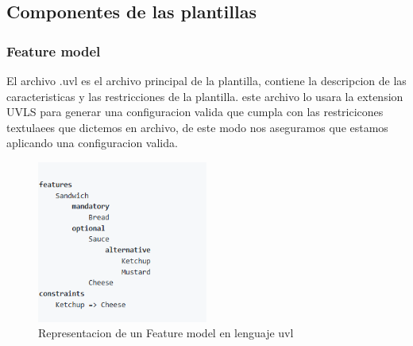 \documentclass[12pt, a4paper, twoside]{article}
\begin{document}
\newpage

\subsection{Componentes de las plantillas}
\subsubsection{Feature model}
El archivo .uvl es el archivo principal de la plantilla, contiene la descripcion de las caracteristicas y las restricciones de la plantilla.
este archivo lo usara la extension UVLS \cite{uvls_code} para generar una configuracion valida que cumpla con las restricicones textulaees que dictemos en archivo, de este modo nos aseguramos que estamos aplicando una configuracion valida.
\begin{figure}[ht]
	\centering
		\includegraphics[width=0.5\textwidth]{text.feature_model.png}
	\caption{Representacion de un Feature model en lenguaje uvl \cite{uvl}}
\end{figure}
\end{document}
